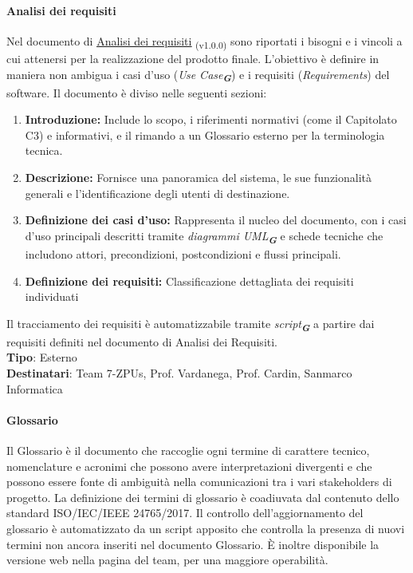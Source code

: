 \documentclass[a4paper,12pt]{article}
\newcommand{\glossario}[1]{\textit{#1}\textsubscript{\textbf{\textit{\textcolor{lightblack}{G}}}}}
\newcommand{\ped}[1]{\textsubscript{#1}}
\begin{document}
\paragraph{Analisi dei requisiti}\label{analisiDeiRequisiti}
Nel documento di
\href{https://7-zpus.github.io/Docs/assets/2_RTB/DocumentiEsterni/AnalisiDeiRequisiti.pdf}{\ul{Analisi
        dei requisiti}} \ped{(v1.0.0)} sono
riportati i bisogni e i vincoli a cui attenersi per la realizzazione del
prodotto finale. L'obiettivo è definire in maniera non ambigua i casi d'uso
(\glossario{\textit{Use Case}}) e i requisiti (\textit{Requirements}) del
software. Il documento è diviso nelle seguenti sezioni:
\begin{enumerate}
    \item \textbf{Introduzione:} Include lo scopo, i riferimenti normativi (come il Capitolato C3) e informativi, e il rimando a un Glossario esterno per la terminologia tecnica.
    \item \textbf{Descrizione:} Fornisce una panoramica del sistema, le sue funzionalità generali e l'identificazione degli utenti di destinazione.
    \item \textbf{Definizione dei casi d'uso:} Rappresenta il nucleo del documento, con i casi d'uso principali descritti tramite \glossario{diagrammi UML} e schede tecniche che includono attori, precondizioni, postcondizioni e flussi principali.
    \item \textbf{Definizione dei requisiti:} Classificazione dettagliata dei requisiti individuati
\end{enumerate}
Il tracciamento dei requisiti è automatizzabile tramite \glossario{script} a partire dai requisiti definiti nel documento di Analisi dei Requisiti. \\
\textbf{Tipo}: Esterno \\
\textbf{Destinatari}: Team 7-ZPUs, Prof. Vardanega, Prof. Cardin, Sanmarco Informatica \\

\paragraph{Glossario}
Il Glossario è il documento che raccoglie ogni termine di carattere tecnico,
nomenclature e acronimi che possono avere interpretazioni divergenti e che
possono essere fonte di ambiguità nella comunicazioni tra i vari stakeholders
di progetto. La definizione dei termini di glossario è coadiuvata dal contenuto
dello standard ISO/IEC/IEEE 24765/2017. Il controllo dell'aggiornamento del
glossario è automatizzato da un script apposito che controlla la presenza di
nuovi termini non ancora inseriti nel documento Glossario. È inoltre
disponibile la versione web nella pagina del team, per una maggiore
operabilità.
\end{document}
